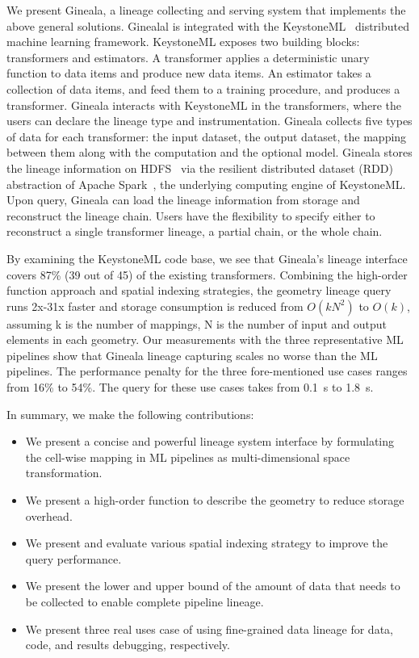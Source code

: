 \documentclass{sig-alternate}
\newenvironment{shortlist}{
        \vspace*{-0.5em}
  \begin{itemize}
  \setlength{\itemsep}{-0.1em}
}{
  \end{itemize}
        \vspace*{-0.5em}
}
\begin{document}
We present Gineala, a lineage collecting and serving system that implements the above general solutions.
Ginealal is integrated with the KeystoneML~\cite{sparks15} distributed machine learning framework.
KeystoneML exposes two building blocks: transformers and estimators. 
A transformer applies a deterministic unary function to data items and produce new data items.
An estimator takes a collection of data items, and feed them to a training procedure,  and produces a transformer.
Gineala interacts with KeystoneML in the transformers, where the users can declare the lineage type and instrumentation.
Gineala collects five types of data for each transformer: the input dataset, the output dataset, the mapping between them
along with the computation and the optional model.
Gineala stores the lineage information on HDFS~\cite{shvachko10} via the resilient distributed dataset (RDD) abstraction
of Apache Spark~\cite{zaharia12}, the underlying computing engine of KeystoneML.
Upon query, Gineala can load the lineage information from storage and reconstruct the lineage chain.
Users have the flexibility to specify either to reconstruct a single transformer lineage, a partial chain, or the whole chain.

By examining the KeystoneML code base, we see that Gineala's lineage interface covers 87\% (39 out of 45) of the existing transformers.
Combining the high-order function approach and spatial indexing strategies, 
the geometry lineage query runs 2x-31x faster and storage consumption is reduced from $O(kN^2)$
to $O(k)$, assuming k is the number of mappings, N is the number of input and output elements in each geometry. 
Our measurements with the three representative ML pipelines show that Gineala lineage capturing scales no worse than the
ML pipelines.
The performance penalty for the three fore-mentioned use cases ranges from 16\% to 54\%.
The query for these use cases takes from 0.1~s to 1.8~s.

In summary, we make the following contributions:
\begin{shortlist}
\item{} We present a concise and powerful lineage system interface by formulating the cell-wise mapping in ML pipelines as multi-dimensional space transformation.
\item{} We present a high-order function to describe the geometry to reduce storage overhead.
\item{} We present and evaluate various spatial indexing strategy to improve the query performance.
\item{} We present the lower and upper bound of the amount of data that needs to be collected to enable complete pipeline lineage.
\item{} We present three real uses case of using fine-grained data lineage for data, code, and results debugging, respectively.
\end{shortlist}
\end{document}
